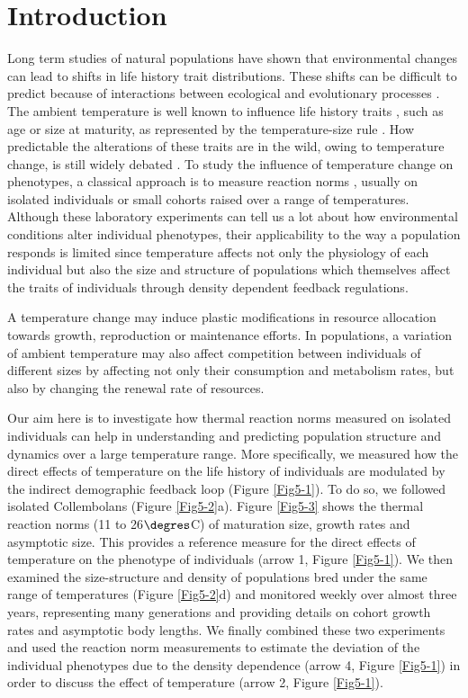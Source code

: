 \section{Introduction}

Long term studies of natural populations have shown that environmental changes
can lead to shifts in life history trait
distributions\autocites{parmesan2006a,ozgul2009a}. These shifts can be difficult
to predict because of interactions between ecological and evolutionary processes
\autocites{kokko2007a}. The ambient temperature is well known to influence life
history traits \autocites{atkinson1996a,angilletta2009a}, such as age or size at maturity, as represented by the temperature-size rule
\autocites{berrigan1994a,fischer2002a,dhillon2004a}. How predictable the
alterations of these traits are in the wild, owing to temperature change, is
still widely debated \autocites{gardner2011a,sheridan2011a}.
To study the influence of temperature change on phenotypes, a classical approach
is to measure reaction norms \autocites{woltereck1909a}, usually on isolated
individuals \autocites{driessen2007a,ellers2011a} or small cohorts
\autocites{karan1998a,liefting2009a} raised over a range of temperatures.
Although these laboratory experiments can tell us a lot about how environmental
conditions alter individual phenotypes, their applicability to the way a
population responds is limited since temperature affects not only the
physiology of each individual but also the size and structure of populations
which themselves affect the traits of individuals through density dependent
feedback regulations.

A temperature change may induce plastic modifications in resource allocation
towards growth, reproduction or maintenance efforts. In populations, a variation
of ambient temperature may also affect competition between individuals of
different sizes by affecting not only their consumption and metabolism rates,
but also by changing the renewal rate of resources.

Our aim here is to investigate how thermal reaction norms measured on isolated
individuals can help in understanding and predicting population structure and
dynamics over a large temperature range. More specifically, we measured how the
direct effects of temperature on the life history of individuals are modulated
by the indirect demographic feedback loop (Figure \ref{Fig5-1}). To do so, we followed
isolated Collembolans (Figure \ref{Fig5-2}a). Figure \ref{Fig5-3} shows the thermal reaction norms (11 to
26$\degres$C) of maturation size, growth rates and asymptotic size. This provides a
reference measure for the direct effects of temperature on the phenotype of
individuals (arrow 1, Figure \ref{Fig5-1}). We then examined the size-structure and density
of populations bred under the same range of temperatures (Figure \ref{Fig5-2}d) and monitored
weekly over almost three years, representing many generations and providing
details on cohort growth rates and asymptotic body lengths. We finally combined
these two experiments and used the reaction norm measurements to estimate the
deviation of the individual phenotypes due to the density dependence (arrow 4,
Figure \ref{Fig5-1}) in order to discuss the effect of temperature (arrow 2, Figure \ref{Fig5-1}).

